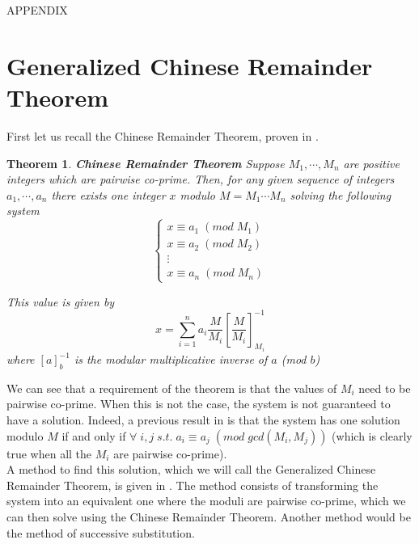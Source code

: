 \documentclass[a4paper,10pt]{article}
\newtheorem{theorem}{Theorem}
\begin{document}
\newpage
\appendix

\huge APPENDIX
\normalsize

\section{Generalized Chinese Remainder Theorem}
\label{sct:appCRT}

First let us recall the Chinese Remainder Theorem, proven in \cite{leiserson2001introduction}.

\begin{theorem}
 \textbf{Chinese Remainder Theorem} Suppose $M_1, \cdots, M_n$ are positive integers which are pairwise co-prime. Then, for any given sequence of integers $a_1, \cdots, a_n$ there exists one integer $x$ modulo $M = M_1 \cdots M_n$ solving the following system
 $$
 \left\{
	\begin{array}{llcl}
		x \equiv a_1 \; (mod \; M_1) \\
		x \equiv a_2 \; (mod \; M_2) \\
		\vdots \\
		x \equiv a_n \; (mod \; M_n)
	\end{array}
\right.
 $$

This value is given by
$$x = \sum_{i=1}^{n} a_i \frac{M}{M_i} \left[ \frac{M}{M_i} \right]_{M_i}^{-1}$$
where $[a]^{-1}_{b}$ is the modular multiplicative inverse of $a$ (mod $b$)
\end{theorem}

We can see that a requirement of the theorem is that the values of $M_i$ need to be pairwise co-prime. When this is not the case, the system is not guaranteed to have a solution. Indeed, a previous result in \cite{leiserson2001introduction} is that the system has one solution modulo $M$ if and only if $\forall \; i,j \; s.t. \; a_i \equiv a_j \; (mod \; gcd(M_i, M_j) )$ (which is clearly true when all the $M_i$ are pairwise co-prime).\\

A method to find this solution, which we will call the Generalized Chinese Remainder Theorem, is given in \cite{mathNonPairwiseCoprime}. The method consists of transforming the system into an equivalent one where the moduli are pairwise co-prime, which we can then solve using the Chinese Remainder Theorem. Another method would be the method of successive substitution.

\newpage
\nocite{*}


\end{document}
